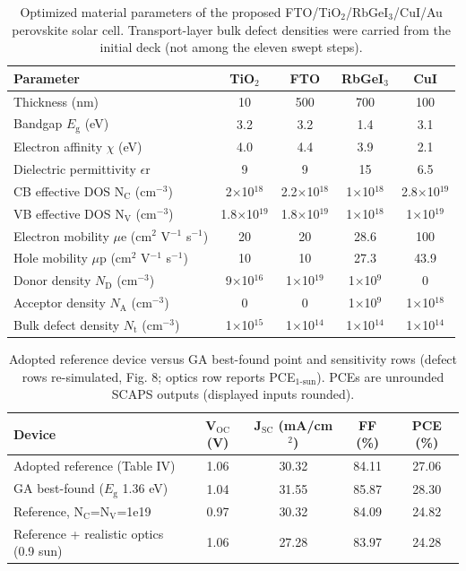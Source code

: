 \documentclass[12pt]{article}
\begin{document}
\begin{table}[htbp]
\centering
{\footnotesize\setlength{\tabcolsep}{3pt}
\begin{tabularx}{\textwidth}{Xcccc}
\hline
Parameter & TiO$_{2}$ & FTO & RbGeI$_{3}$ & CuI
\\\hline
Thickness (nm) & 10 & 500 & 700 & 100\\
Bandgap $E_{\mathrm{g}}$ (eV) & 3.2 & 3.2 & 1.4 & 3.1\\
Electron affinity $\chi$ (eV) & 4.0 & 4.4 & 3.9 & 2.1\\
Dielectric permittivity $\epsilon$r & 9 & 9 & 15 & 6.5\\
CB effective DOS N$_{\mathrm{C}}$ (cm$^{-3}$) & 2$\times$10$^{18}$ & 2.2$\times$10$^{18}$ & 1$\times$10$^{18}$ & 2.8$\times$10$^{19}$\\
VB effective DOS N$_{\mathrm{V}}$ (cm$^{-3}$) & 1.8$\times$10$^{19}$ & 1.8$\times$10$^{19}$ & 1$\times$10$^{18}$ & 1$\times$10$^{19}$\\
Electron mobility $\mu$e (cm$^{2}$ V$^{-1}$ s$^{-1}$) & 20 & 20 & 28.6 & 100\\
Hole mobility $\mu$p (cm$^{2}$ V$^{-1}$ s$^{-1}$) & 10 & 10 & 27.3 & 43.9\\
Donor density $N_{\mathrm{D}}$ (cm$^{-3}$) & 9$\times$10$^{16}$ & 1$\times$10$^{19}$ & 1$\times$10$^{9}$ & 0\\
Acceptor density $N_{\mathrm{A}}$ (cm$^{-3}$) & 0 & 0 & 1$\times$10$^{9}$ & 1$\times$10$^{18}$\\
Bulk defect density $N_{\mathrm{t}}$ (cm$^{-3}$) & 1$\times$10$^{15}$ & 1$\times$10$^{14}$ & 1$\times$10$^{14}$ & 1$\times$10$^{14}$\\
\hline
\end{tabularx}
}
\caption{Optimized material parameters of the proposed FTO/\allowbreak{}TiO$_{2}$/RbGeI$_{3}$/CuI/\allowbreak{}Au perovskite solar cell. Transport-layer bulk defect densities were carried from the initial deck (not among the eleven swept steps).}
\end{table}

\begin{table}[htbp]
\centering
{\footnotesize\setlength{\tabcolsep}{3pt}
\begin{tabularx}{\textwidth}{Xcccc}
\hline
Device & V$_{\mathrm{OC}}$ (V) & J$_{\mathrm{SC}}$ (mA/cm$^{2}$) & FF (\%) & PCE (\%)
\\\hline
Adopted reference (Table IV) & 1.06 & 30.32 & 84.11 & 27.06\\
GA best-found ($E_{\mathrm{g}}$ 1.36 eV) & 1.04 & 31.55 & 85.87 & 28.30\\
Reference, N$_{\mathrm{C}}$=N$_{\mathrm{V}}$=1e19 & 0.97 & 30.32 & 84.09 & 24.82\\
Reference + realistic optics (0.9 sun) & 1.06 & 27.28 & 83.97 & 24.28\\
\hline
\end{tabularx}
}
\caption{Adopted reference device versus GA best-found point and sensitivity rows (defect rows re-simulated, Fig. 8; optics row reports PCE$_{1\text{-sun}}$). PCEs are unrounded SCAPS outputs (displayed inputs rounded).}
\end{table}
\end{document}
